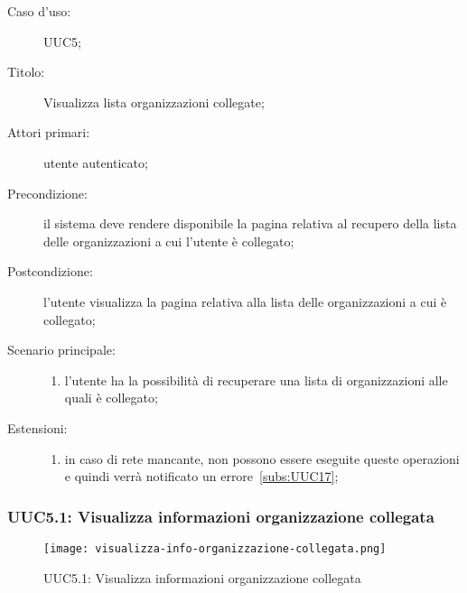 \documentclass[../../../analisi-dei-requisiti.tex]{subfiles}
\begin{document}
\begin{description}
  \item[Caso d'uso:] UUC5;
  \item[Titolo:] Visualizza lista organizzazioni collegate;
  \item[Attori primari:] utente autenticato;
  \item[Precondizione:] il sistema deve rendere disponibile la pagina relativa al recupero della lista delle organizzazioni a cui l'utente è collegato;
  \item[Postcondizione:] l'utente visualizza la pagina relativa alla lista delle organizzazioni a cui è collegato;
  \item[Scenario principale:]
        \begin{enumerate}
          \item l'utente ha la possibilità di recuperare una lista di organizzazioni alle quali è collegato;
        \end{enumerate}
  \item[Estensioni:]
        \begin{enumerate}
          \item in caso di rete mancante, non possono essere eseguite queste operazioni e quindi verrà notificato un errore~\ref{subs:UUC17};
        \end{enumerate}
\end{description}

\subsubsection{UUC5.1: Visualizza informazioni organizzazione collegata}%
\label{subs:UUC5.1}

\begin{figure}[H]
  \centering
  \texttt{[image: visualizza-info-organizzazione-collegata.png]}
  \caption{UUC5.1: Visualizza informazioni organizzazione collegata}%
  \label{fig:UUC5.1}
\end{figure}
\end{document}
